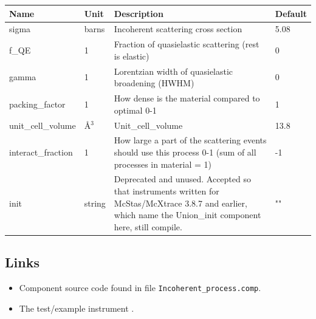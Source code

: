 \begin{longtable}{p{}p{}p{}p{}}
\toprule
\textbf{Name} & \textbf{Unit} & \textbf{Description} & \textbf{Default} \\
\midrule
\endhead
sigma & barns & Incoherent scattering cross section & 5.08 \\
f\_QE & 1 & Fraction of quasielastic scattering (rest is elastic) & 0 \\
gamma & 1 & Lorentzian width of quasielastic broadening (HWHM) & 0 \\
packing\_factor & 1 & How dense is the material compared to optimal 0-1 & 1 \\
unit\_cell\_volume & \AA{}$^{3}$ & Unit\_cell\_volume & 13.8 \\
interact\_fraction & 1 & How large a part of the scattering events should use this process 0-1 (sum of all processes in material = 1) & -1 \\
init & string & Deprecated and unused. Accepted so that instruments written for McStas/McXtrace 3.8.7 and earlier, which name the Union\_init component here, still compile. & "" \\
\bottomrule
\end{longtable}

\subsection*{Links}
\begin{itemize}
  \item Component source code found in file \texttt{Incoherent\_process.comp}.
  \item The test/example instrument .
\end{itemize}
